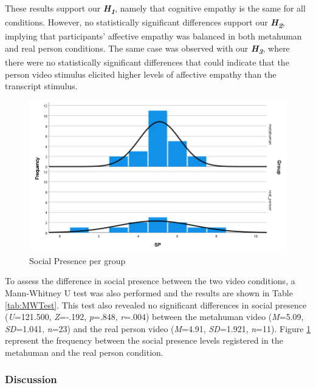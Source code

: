 These results support our \textbf{\textit{H\textsubscript{1}}}, namely that cognitive empathy is the same for all conditions. However, no statistically significant differences support our \textbf{\textit{H\textsubscript{2}}}, implying that participants' affective empathy was balanced in both metahuman and real person conditions. The same case was observed with our \textbf{\textit{H\textsubscript{3}}}, where there were no statistically significant differences that could indicate that the person video stimulus elicited higher levels of affective empathy than the transcript stimulus.

\begin{figure}[!htb]
\includegraphics[width=\textwidth]{figures/MWSample.png}
\centering
\caption{Social Presence per group}
\label{fig:MWSample}
\end{figure}

To assess the difference in social presence between the two video conditions, a Mann-Whitney U test was also performed and the results are shown in Table \ref{tab:MWTest}. This test also revealed no significant differences in social presence (\textit{U}=121.500, \textit{Z}=-.192, \textit{p}=.848, \textit{r}=.004) between the metahuman video (\textit{M}=5.09, \textit{SD}=1.041, \textit{n}=23) and the real person video (\textit{M}=4.91, \textit{SD}=1.921, \textit{n}=11). Figure \ref{fig:MWSample} represent the frequency between the social presence levels registered in the metahuman and the real person condition.

\subsubsection{Discussion}

